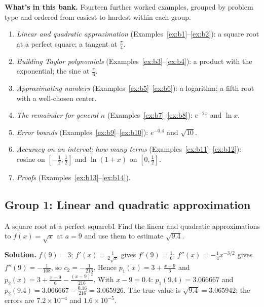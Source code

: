 \documentclass[11pt]{article}
\begin{document}
\textbf{What's in this bank.} Fourteen further worked examples, grouped by problem type and ordered from easiest to hardest within each group.
\begin{enumerate}[nosep]
  \item \emph{Linear and quadratic approximation} (Examples~\ref{ex:b1}--\ref{ex:b2}): a square root at a perfect square; a tangent at $\frac\pi4$.
  \item \emph{Building Taylor polynomials} (Examples~\ref{ex:b3}--\ref{ex:b4}): a product with the exponential; the sine at $\frac\pi6$.
  \item \emph{Approximating numbers} (Examples~\ref{ex:b5}--\ref{ex:b6}): a logarithm; a fifth root with a well-chosen center.
  \item \emph{The remainder for general $n$} (Examples~\ref{ex:b7}--\ref{ex:b8}): $e^{-2x}$ and $\ln x$.
  \item \emph{Error bounds} (Examples~\ref{ex:b9}--\ref{ex:b10}): $e^{-0.4}$ and $\sqrt{10}$.
  \item \emph{Accuracy on an interval; how many terms} (Examples~\ref{ex:b11}--\ref{ex:b12}): cosine on $[-\frac12,\frac12]$ and $\ln(1+x)$ on $[0,\frac12]$.
  \item \emph{Proofs} (Examples~\ref{ex:b13}--\ref{ex:b14}).
\end{enumerate}

\subsection*{Group 1: Linear and quadratic approximation}

\begin{exmp}{A square root at a perfect square}{b1}
Find the linear and quadratic approximations to $f(x)=\sqrt x$ at $a=9$ and use them to estimate $\sqrt{9.4}$.

\textbf{Solution.} $f(9)=3$; $f'(x)=\frac1{2\sqrt x}$ gives $f'(9)=\frac16$; $f''(x)=-\frac14x^{-3/2}$ gives $f''(9)=-\frac1{108}$, so $c_2=-\frac1{216}$. Hence $p_1(x)=3+\frac{x-9}6$ and $p_2(x)=3+\frac{x-9}6-\frac{(x-9)^2}{216}$. With $x-9=0.4$: $p_1(9.4)=3.066667$ and $p_2(9.4)=3.066667-\frac{0.16}{216}=3.065926$. The true value is $\sqrt{9.4}=3.065942$; the errors are $7.2\times10^{-4}$ and $1.6\times10^{-5}$.
\end{exmp}
\end{document}
